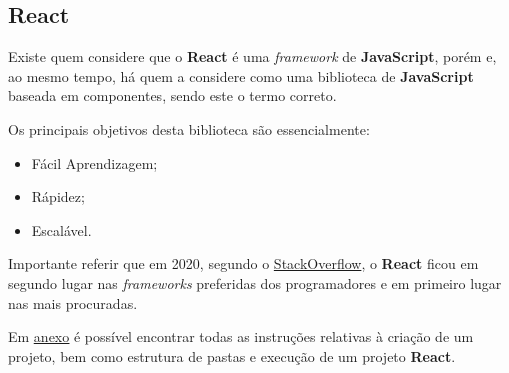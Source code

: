 \subsection{React}

\begin{minipage}[t]{.3\textwidth}
\end{minipage}
\begin{minipage}[t]{.7\textwidth}
	\minipagerestore
	Existe quem considere que o \textbf{React} é uma \textit{framework} de \textbf{JavaScript}, porém e, ao mesmo tempo, há quem a considere como uma biblioteca de \textbf{JavaScript} baseada em componentes, sendo este o termo correto.

	Os principais objetivos desta biblioteca são essencialmente:

	\begin{itemize}
		\item Fácil Aprendizagem;
		\item Rápidez;
		\item Escalável.
	\end{itemize}
\end{minipage}

\vspace{0.2cm}

Importante referir que em 2020, segundo o \href{https://insights.stackoverflow.com/survey/2020#technology-most-loved-dreaded-and-wanted-web-frameworks-loved2}{StackOverflow}, o \textbf{React} ficou em segundo lugar nas \textit{frameworks} preferidas dos programadores e em primeiro lugar nas mais procuradas.

Em \underline{\hyperref[reactAttachments]{anexo}} é possível encontrar todas as instruções relativas à criação de um projeto, bem como estrutura de pastas e execução de um projeto \textbf{React}.

